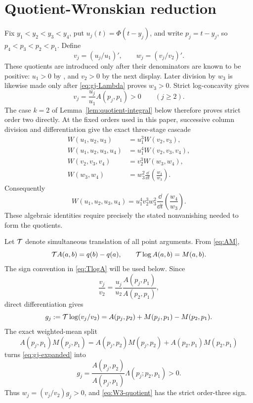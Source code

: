 \section{Quotient-Wronskian reduction}\label{sec:quotient}

Fix \(y_1<y_2<y_3<y_4\), put \(u_j(t)=\Phi(t-y_j)\), and write
\(p_j=t-y_j\), so \(p_4<p_3<p_2<p_1\). Define
\[
 v_j=(u_j/u_1)',\qquad w_j=(v_j/v_2)'.
\]
These quotients are introduced only after their denominators are known to be
positive: \(u_1>0\) by , and \(v_2>0\) by the next
display. Later division by \(w_3\) is likewise made only after
\eqref{eq:gj-Lambda} proves \(w_3>0\).
Strict log-concavity gives
\[
 v_j=\frac{u_j}{u_1}A(p_j,p_1)>0\qquad(j\geq2).
\]
The case \(k=2\) of Lemma~\ref{lem:quotient-integral} below therefore proves
strict order two directly.
At the fixed orders used in this paper, successive column division and
differentiation give the exact three-stage cascade
\begin{align}
 W(u_1,u_2,u_3)&=u_1^3W(v_2,v_3),\label{eq:W3-quotient}\\
 W(u_1,u_2,u_3,u_4)&=u_1^4W(v_2,v_3,v_4),\label{eq:W4-first}\\
 W(v_2,v_3,v_4)&=v_2^3W(w_3,w_4),\label{eq:W4-second}\\
 W(w_3,w_4)&=w_3^2\frac{\dd}{\dd t}
 \left(\frac{w_4}{w_3}\right).\label{eq:W4-third}
\end{align}
Consequently
\begin{equation}\label{eq:W4-quotient}
 W(u_1,u_2,u_3,u_4)=u_1^4v_2^3w_3^2
 \frac{\dd}{\dd t}\left(\frac{w_4}{w_3}\right).
\end{equation}
These algebraic identities require precisely the stated nonvanishing needed
to form the quotients.

Let \(\mathcal{T}\) denote simultaneous translation of all point arguments. From
\eqref{eq:AM},
\begin{equation}\label{eq:TlogA}
 \mathcal{T} A(a,b)=q(b)-q(a),\qquad \mathcal{T}\log A(a,b)=M(a,b).
\end{equation}
The sign convention in \eqref{eq:TlogA} will be used below. Since
\[
 \frac{v_j}{v_2}=\frac{u_j}{u_2}
 \frac{A(p_j,p_1)}{A(p_2,p_1)},
\]
direct differentiation gives
\begin{equation}\label{eq:gj-expanded}
 g_j:=\mathcal{T}\log(v_j/v_2)
 =A(p_j,p_2)+M(p_j,p_1)-M(p_2,p_1).
\end{equation}
The exact weighted-mean split
\[
 A(p_j,p_1)M(p_j,p_1)
 =A(p_j,p_2)M(p_j,p_2)+A(p_2,p_1)M(p_2,p_1)
\]
turns \eqref{eq:gj-expanded} into
\begin{equation}\label{eq:gj-Lambda}
 g_j=\frac{A(p_j,p_2)}{A(p_j,p_1)}
 \Lambda(p_j;p_2,p_1)>0.
\end{equation}
Thus \(w_j=(v_j/v_2)g_j>0\), and
\eqref{eq:W3-quotient} has the strict order-three sign.

